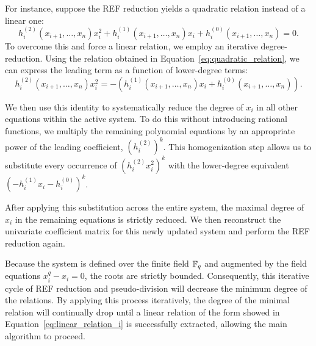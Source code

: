 For instance, suppose the REF reduction yields a quadratic relation instead of a linear one:
\begin{equation}
    h_i^{(2)}(x_{i+1}, \dots, x_n) x_i^2 + h_i^{(1)}(x_{i+1}, \dots, x_n) x_i + h_i^{(0)}(x_{i+1}, \dots, x_n) = 0.
    \label{eq:quadratic_relation}
\end{equation}
To overcome this and force a linear relation, we employ an iterative degree-reduction. Using the relation obtained in Equation~\ref{eq:quadratic_relation}, we can express the leading term as a function of lower-degree terms:
\begin{equation*}
    h_i^{(2)}(x_{i+1}, \dots, x_n) x_i^2 = -\left( h_i^{(1)}(x_{i+1}, \dots, x_n) x_i + h_i^{(0)}(x_{i+1}, \dots, x_n) \right).
\end{equation*}

We then use this identity to systematically reduce the degree of $x_i$ in all other equations within the active system. To do this without introducing rational functions, we multiply the remaining polynomial equations by an appropriate power of the leading coefficient, ${(h_i^{(2)})}^k$. This homogenization step allows us to substitute every occurrence of ${(h_i^{(2)} x_i^2)}^k$ with the lower-degree equivalent ${\left( -h_i^{(1)} x_i - h_i^{(0)} \right)}^k$.

After applying this substitution across the entire system, the maximal degree of $x_i$ in the remaining equations is strictly reduced. We then reconstruct the univariate coefficient matrix for this newly updated system and perform the REF reduction again. 

Because the system is defined over the finite field $\mathbb{F}_q$ and augmented by the field equations $x_i^q - x_i = 0$, the roots are strictly bounded. Consequently, this iterative cycle of REF reduction and pseudo-division will decrease the minimum degree of the relations. By applying this process iteratively, the degree of the minimal relation will continually drop until a linear relation of the form showed in Equation~\ref{eq:linear_relation_i} is successfully extracted, allowing the main algorithm to proceed.
